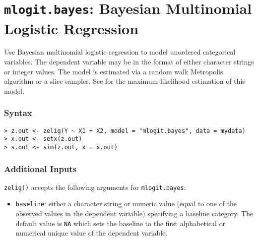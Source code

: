 \section{\texttt{mlogit.bayes}: Bayesian Multinomial Logistic
Regression}

\label{mlogit.bayes}

Use Bayesian multinomial logistic regression to model unordered
categorical variables.  The dependent variable may be in the format of
either character strings or integer values.  The model is estimated
via a random walk Metropolis algorithm or a slice sampler.  See
 for the maximum-likelihood estimation of this model.

\subsubsection{Syntax}
\begin{verbatim}
> z.out <- zelig(Y ~ X1 + X2, model = "mlogit.bayes", data = mydata)
> x.out <- setx(z.out)
> s.out <- sim(z.out, x = x.out)
\end{verbatim}

\subsubsection{Additional Inputs}

{\tt zelig()} accepts the following arguments for {\tt mlogit.bayes}:
\begin{itemize}
\item \texttt{baseline}: either a character string or numeric value
(equal to one of the observed values in the dependent variable)
specifying a baseline category.  The default value is \texttt{NA}
which sets the baseline to the first alphabetical or numerical unique
value of the dependent variable.
\end{itemize}

